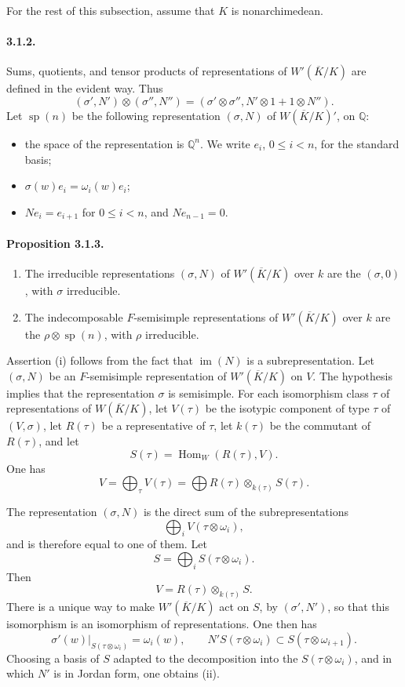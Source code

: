 \documentclass[10pt,a4paper]{article}
\providecommand{\Hom}{\operatorname{Hom}}
\providecommand{\im}{\operatorname{im}}
\providecommand{\sprep}{\operatorname{sp}}
\providecommand{\Q}{\mathbb Q}
\begin{document}
For the rest of this subsection, assume that \(K\) is nonarchimedean.

\paragraph{3.1.2.} Sums, quotients, and tensor products of representations of \(W'(\overline K/K)\) are defined in the evident way. Thus
\[
(\sigma',N')\otimes(\sigma'',N'')=(\sigma'\otimes\sigma'',N'\otimes1+1\otimes N'').
\]
Let \(\sprep(n)\) be the following representation \((\sigma,N)\) of \(W(\overline K/K)'\), on \(\Q\):
\begin{itemize}
\item the space of the representation is \(\Q^n\). We write \(e_i\), \(0\le i<n\), for the standard basis;
\item \(\sigma(w)e_i=\omega_i(w)e_i\);
\item \(Ne_i=e_{i+1}\) for \(0\le i<n\), and \(Ne_{n-1}=0\).
\end{itemize}

\paragraph{Proposition 3.1.3.}{\itshape 
\begin{enumerate}[label=(\roman*)]
\item The irreducible representations \((\sigma,N)\) of \(W'(\overline K/K)\) over \(k\) are the \((\sigma,0)\), with \(\sigma\) irreducible.
\item The indecomposable \(F\)-semisimple representations of \(W'(\overline K/K)\) over \(k\) are the \(\rho\otimes\sprep(n)\), with \(\rho\) irreducible.
\end{enumerate}\par}

Assertion (i) follows from the fact that \(\im(N)\) is a subrepresentation. Let \((\sigma,N)\) be an \(F\)-semisimple representation of \(W'(\overline K/K)\) on \(V\). The hypothesis implies that the representation \(\sigma\) is semisimple. For each isomorphism class \(\tau\) of representations of \(W(\overline K/K)\), let \(V(\tau)\) be the isotypic component of type \(\tau\) of \((V,\sigma)\), let \(R(\tau)\) be a representative of \(\tau\), let \(k(\tau)\) be the commutant of \(R(\tau)\), and let
\[
S(\tau)=\Hom_W(R(\tau),V).
\]
One has
\[
V=\bigoplus_\tau V(\tau)=\bigoplus R(\tau)\otimes_{k(\tau)}S(\tau).
\]

\clearpage
{}
\hypertarget{authority-40}{}
The representation \((\sigma,N)\) is the direct sum of the subrepresentations
\[
\bigoplus_i V(\tau\otimes\omega_i),
\]
and is therefore equal to one of them. Let
\[
S=\bigoplus_i S(\tau\otimes\omega_i).
\]
Then
\[
V=R(\tau)\otimes_{k(\tau)}S.
\]
There is a unique way to make \(W'(\overline K/K)\) act on \(S\), by \((\sigma',N')\), so that this isomorphism is an isomorphism of representations. One then has
\[
\sigma'(w)|_{S(\tau\otimes\omega_i)}=\omega_i(w),
\qquad
N'S(\tau\otimes\omega_i)\subset S(\tau\otimes\omega_{i+1}).
\]
Choosing a basis of \(S\) adapted to the decomposition into the \(S(\tau\otimes\omega_i)\), and in which \(N'\) is in Jordan form, one obtains (ii).
\end{document}
